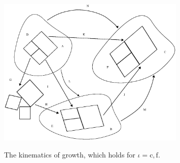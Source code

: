 \begin{figure}[ht]
  \centering
         {\includegraphics[width=0.8\textwidth]{images/elucidation/kinematics}}
     \caption{The kinematics of growth, which holds for $\iota =
     \mathrm{c,f}$.} 
     \label{growthkine}
\end{figure}

